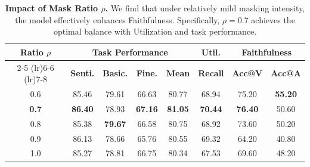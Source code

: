 \documentclass{article}
\theoremstyle{plain}
\theoremstyle{definition}
\theoremstyle{remark}
\begin{document}
\begin{table}[t]
\centering

\fontsize{8}{10}\selectfont 
\renewcommand{\arraystretch}{1.2}
\setlength{\tabcolsep}{3.2pt}

\caption{\textbf{Impact of Mask Ratio $\rho$.} We find that under relatively mild masking intensity, the model effectively enhances Faithfulness. Specifically, $\rho=0.7$ achieves the optimal balance with Utilization and task performance.}
\label{tab:ablation_rho}

\begin{tabular}{c c c c c c c c}
    \toprule

    \multirow{2}{*}{\textbf{Ratio $\rho$}} 
    & \multicolumn{4}{c}{\textbf{Task Performance}} 
    & \textbf{Util.} 
    & \multicolumn{2}{c}{\textbf{Faithfulness}} \\
    \cmidrule(lr){2-5}
    \cmidrule(lr){6-6}
    \cmidrule(lr){7-8}
    
    & \textbf{Senti.} 
    & \textbf{Basic.} 
    & \textbf{Fine.} 
    & \textbf{Mean} 
    & \textbf{Recall} 
    & \textbf{Acc@V} 
    & \textbf{Acc@A} \\
    \midrule
    
    0.6 & 85.46 & 79.61 & 66.63 & 80.77 & 68.94 & 75.20 & \textbf{55.20} \\
    
    \rowcolor{tabhighlight} 
    \textbf{0.7} & \textbf{86.40} & 78.93 & \textbf{67.16} & \textbf{81.05} & \textbf{70.44} & \textbf{76.40} & 50.60 \\
    
    0.8 & 85.38 & \textbf{79.67} & 66.58 & 80.75 & 68.92 & 73.60 & 50.20 \\
    0.9 & 86.13 & 78.66 & 65.76 & 80.55 & 69.32 & 64.20 & 40.80 \\
    1.0 & 85.27 & 78.81 & 66.75 & 80.34 & 67.53 & 69.60 & 48.20 \\
    
    \bottomrule
\end{tabular}
\vspace{-5mm}
\end{table}




    
    
    
    
\end{document}
